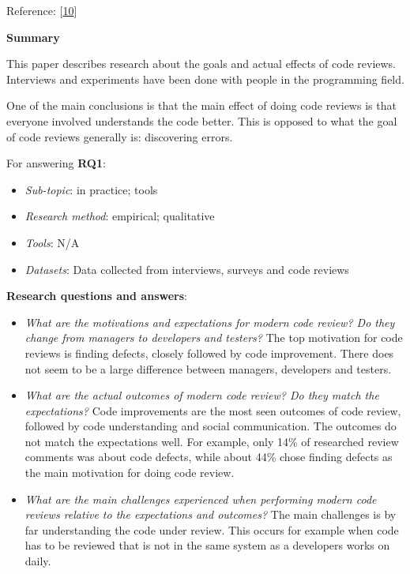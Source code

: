 \documentclass[]{book}
\providecommand{\tightlist}{%
  \setlength{\itemsep}{0pt}\setlength{\parskip}{0pt}}
\begin{document}
Reference: {[}\protect\hyperlink{ref-bacchelli2013expectations}{10}{]}

\textbf{Summary}

This paper describes research about the goals and actual effects of code
reviews. Interviews and experiments have been done with people in the
programming field.

One of the main conclusions is that the main effect of doing code
reviews is that everyone involved understands the code better. This is
opposed to what the goal of code reviews generally is: discovering
errors.

For answering \textbf{RQ1}:

\begin{itemize}
\tightlist
\item
  \emph{Sub-topic}: in practice; tools
\item
  \emph{Research method}: empirical; qualitative
\item
  \emph{Tools}: N/A
\item
  \emph{Datasets}: Data collected from interviews, surveys and code
  reviews
\end{itemize}

\textbf{Research questions and answers}:

\begin{itemize}
\tightlist
\item
  \emph{What are the motivations and expectations for modern code
  review? Do they change from managers to developers and testers?} The
  top motivation for code reviews is finding defects, closely followed
  by code improvement. There does not seem to be a large difference
  between managers, developers and testers.
\item
  \emph{What are the actual outcomes of modern code review? Do they
  match the expectations?} Code improvements are the most seen outcomes
  of code review, followed by code understanding and social
  communication. The outcomes do not match the expectations well. For
  example, only 14\% of researched review comments was about code
  defects, while about 44\% chose finding defects as the main motivation
  for doing code review.
\item
  \emph{What are the main challenges experienced when performing modern
  code reviews relative to the expectations and outcomes?} The main
  challenges is by far understanding the code under review. This occurs
  for example when code has to be reviewed that is not in the same
  system as a developers works on daily.
\end{itemize}
\end{document}
